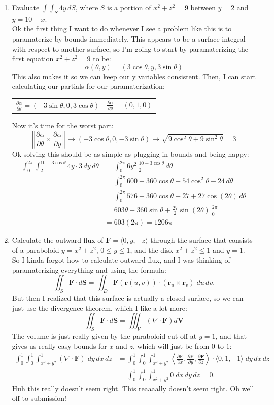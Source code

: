 \documentclass[10pt,oneside]{book}
\newcommand{\prt}[2]{\frac{\partial #1}{\partial #2}}
\newcommand{\dsp}{\displaystyle}
\newcommand{\magnitude}[1]{\left|\left| #1\right|\right|}
\newcommand{\en}{\vspace{0.25cm}\\}
\newcommand{\centerit}[1]{{\begin{center} #1 \end{center}}}
\begin{document}
\begin{enumerate}
    \item Evaluate $\int\int_S 4y\,dS$, where $S$ is a portion of $x^2+z^2 = 9$ between $y = 2$ and $y= 10-x$. \en
    Ok the first thing I want to do whenever I see a problem like this is to paramaterize by bounds immediately. This appears to be a surface integral with respect to another surface, so I'm going to start by paramaterizing the first equation $x^2 + z^2 = 9$ to be:
    \[\alpha(\theta, y) = (3\cos\theta, y, 3\sin\theta)\]
    This also makes it so we can keep our y variables consistent. Then, I can start calculating our partials for our paramaterization:
    \centerit{
        \begin{tabular}{cc}
            $\dsp\prt{\alpha}{\theta} = (-3\sin\theta, 0, 3\cos\theta)$ & $\dsp\prt{\alpha}{y}=(0,1,0)$
        \end{tabular}
    }
    Now it's time for the worst part:
    \[\magnitude{\prt{\alpha}\theta \times \prt{\alpha}y} \to (-3\cos\theta, 0,-3\sin\theta)\to \sqrt{9\cos^2\theta + 9\sin^2\theta} = 3\]
    Ok solving this should be as simple as plugging in bounds and being happy:
    \begin{align*}
        \int_0^{2\pi}\int_2^{10-3\cos\theta}4y\cdot 3\,dy\,d\theta &=\int_0^{2\pi}6y^2\Big|_2^{10-3\cos\theta}\,d\theta\\
        &=\int_0^{2\pi}600-360\cos\theta + 54\cos^2\theta  - 24\,d\theta\\
        &=\int_0^{2\pi}576-360\cos\theta + 27 + 27\cos(2\theta)\,d\theta\\
        &=603\theta - 360\sin\theta + \frac{27}2\sin(2\theta)\Big|_0^{2\pi}\\
        &=603(2\pi) = \boxed{1206\pi}
    \end{align*}
    \item Calculate the outward flux of $\mathbf F = \langle 0, y, -z\rangle$ through the surface that consists of a paraboloid $y = x^2 + z^2$, $0\le y\le 1$, and the disk $x^2+z^2\le 1$ and $y= 1$. \en
    So I kinda forgot how to calculate outward flux, and I was thinking of paramaterizing everything and using the formula:
    \[\iint_S\mathbf F \cdot d\mathbf S =\iint_D \mathbf{F}(\mathbf{r}(u,v))\cdot (\mathbf{r}_u \times \mathbf{r}_v)\; du\,dv.\]
    But then I realized that this surface is actually a closed surface, so we can just use the divergence theorem, which I like a lot more:
    \[\iint_S\mathbf F \cdot d\mathbf S = \iiint_V(\nabla \cdot \mathbf F)d\mathbf V\]
    The volume is just really given by the paraboloid cut off at $y =1$, and that gives us really easy bounds for $x$ and $z$, which will just be from $0$ to $1$:
    \begin{align*}
        \int_0^1\int_0^1\int_{x^2+y^2}^1 (\nabla \cdot \mathbf F)\;dy\,dx\,dz &=\int_0^1\int_0^1\int_{x^2+y^2}^1 \left\langle \prt{\mathbf F}x, \prt{\mathbf F}y, \prt{\mathbf F}z \right\rangle \cdot \langle 0, 1, -1\rangle \;dy\,dx\,dz \\
        &=\int_0^1\int_0^1\int_{x^2+y^2}^1 0 \;dx\,dy\,dz = \boxed{0}.
    \end{align*}
    Huh this really doesn't seem right. This reaaaally doesn't seem right. Oh well off to submission!
\end{enumerate}
\end{document}
